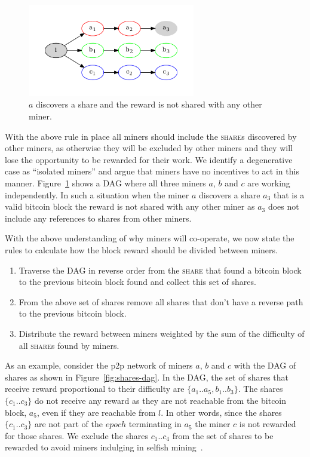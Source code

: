 \documentclass{article}
\begin{document}
\begin{figure}
  \begin{center}
    \includegraphics[width=0.65\textwidth]{isolated-miners}
    \caption{$a$ discovers a share and the reward is not shared with any
      other miner.}\label{fig:isolated-miners}
  \end{center}    
\end{figure}

With the above rule in place all miners should include the
\textsc{share}s discovered by other miners, as otherwise they will be
excluded by other miners and they will lose the opportunity to be
rewarded for their work. We identify a degenerative case as ``isolated
miners'' and argue that miners have no incentives to act in this
manner. Figure~\ref{fig:isolated-miners} shows a DAG where all three
miners $a$, $b$ and $c$ are working independently. In such a situation
when the miner $a$ discovers a share $a_3$ that is a valid bitcoin
block the reward is not shared with any other miner as $a_3$ does not
include any references to shares from other miners.

With the above understanding of why miners will co-operate, we now
state the rules to calculate how the block reward should be divided
between miners.

\begin{enumerate}
\item Traverse the DAG in reverse order from the \textsc{share} that
  found a bitcoin block to the previous bitcoin block found and
  collect this set of shares.
\item From the above set of shares remove all shares that don't have
  a reverse path to the previous bitcoin block.
\item Distribute the reward between miners weighted by the sum of the
  difficulty of all \textsc{share}s found by miners.
\end{enumerate}

As an example, consider the p2p network of miners $a$, $b$ and $c$
with the DAG of shares as shown in Figure~\ref{fig:shares-dag}. In the
DAG, the set of shares that receive reward proportional to their
difficulty are $\{a_1..a_5, b_1..b_3\}$. The shares $\{c_1..c_3\}$ do
not receive any reward as they are not reachable from the bitcoin
block, $a_5$, even if they are reachable from $l$. In other words,
since the shares $\{c_1..c_3\}$ are not part of the $epoch$
terminating in $a_5$ the miner $c$ is not rewarded for those
shares. We exclude the shares $c_1..c_4$ from the set of shares to be
rewarded to avoid miners indulging in selfish
mining~\cite{majority-is-not-enough}.
\end{document}
